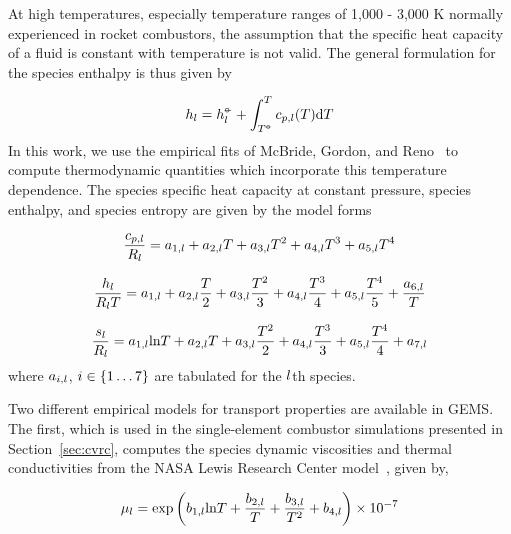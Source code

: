 At high temperatures, especially temperature ranges of 1,000 - 3,000 K normally experienced in rocket combustors, the assumption that the specific heat capacity of a fluid is constant with temperature is not valid. The general formulation for the species enthalpy is thus given by

\begin{eqnarray}
	h_{l} = h^{\circ\kern-0.47em-}_{l} + \int_{T^{\circ\kern-0.47em-}}^{T} c_{p,l}(T) \text{d}T
\end{eqnarray}
In this work, we use the empirical fits of McBride, Gordon, and Reno~\cite{McBride1993} to compute thermodynamic quantities which incorporate this temperature dependence. The species specific heat capacity at constant pressure, species enthalpy, and species entropy are given by the model forms

\begin{equation}
	\frac{c_{p,l}}{R_{l}} = a_{1,l} + a_{2,l} T + a_{3,l} T^2 + a_{4,l} T^3 + a_{5,l} T^4
\end{equation}

\begin{equation}
	\frac{h_{l}}{R_{l} T} = a_{1,l} + a_{2,l} \frac{T}{2} + a_{3,l} \frac{T^2}{3} + a_{4,l} \frac{T^3}{4} + a_{5,l} \frac{T^4}{5} + \frac{a_{6,l}}{T}
\end{equation}

\begin{equation}
	\frac{s_{l}}{R_{l}} = a_{1,l} \text{ln}T + a_{2,l} T + a_{3,l} \frac{T^2}{2} + a_{4,l} \frac{T^3}{3} + a_{5,l} \frac{T^4}{4} + a_{7,l}
\end{equation}
where $a_{i,l}$, $i \in \{1 \hdots 7\}$ are tabulated for the $l$th species.

Two different empirical models for transport properties are available in GEMS. The first, which is used in the single-element combustor simulations presented in Section~\ref{sec:cvrc}, computes the species dynamic viscosities and thermal conductivities from the NASA Lewis Research Center model~\cite{Svehla1995}, given by, 

\begin{equation}
	\mu_{l} = \text{exp} \left(b_{1,l} \text{ln} T + \frac{b_{2,l}}{T} + \frac{b_{3,l}}{T^2} + b_{4,l} \right) \times 10^{-7}
\end{equation}

